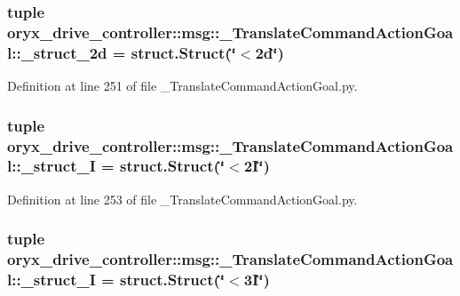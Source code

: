 \subsubsection[{\-\_\-struct\-\_\-2d}]{\setlength{\rightskip}{0pt plus 5cm}tuple {\bf oryx\-\_\-drive\-\_\-controller\-::msg\-::\-\_\-\-Translate\-Command\-Action\-Goal\-::\-\_\-struct\-\_\-2d} = struct.\-Struct(\char`\"{}$<$2d\char`\"{})}\label{namespaceoryx__drive__controller_1_1msg_1_1__TranslateCommandActionGoal_a35e194d5e435168d5c28399f1a5ee002}


\-Definition at line 251 of file \-\_\-\-Translate\-Command\-Action\-Goal.\-py.

\subsubsection[{\-\_\-struct\-\_\-2\-I}]{\setlength{\rightskip}{0pt plus 5cm}tuple {\bf oryx\-\_\-drive\-\_\-controller\-::msg\-::\-\_\-\-Translate\-Command\-Action\-Goal\-::\-\_\-struct\-\_\-I} = struct.\-Struct(\char`\"{}$<$2\-I\char`\"{})}\label{namespaceoryx__drive__controller_1_1msg_1_1__TranslateCommandActionGoal_a6d7dea471b5b3b227b253f1246671fac}


\-Definition at line 253 of file \-\_\-\-Translate\-Command\-Action\-Goal.\-py.

\subsubsection[{\-\_\-struct\-\_\-3\-I}]{\setlength{\rightskip}{0pt plus 5cm}tuple {\bf oryx\-\_\-drive\-\_\-controller\-::msg\-::\-\_\-\-Translate\-Command\-Action\-Goal\-::\-\_\-struct\-\_\-I} = struct.\-Struct(\char`\"{}$<$3\-I\char`\"{})}\label{namespaceoryx__drive__controller_1_1msg_1_1__TranslateCommandActionGoal_a0b09387e30e572d67dbd21cbfdf3c2d1}



